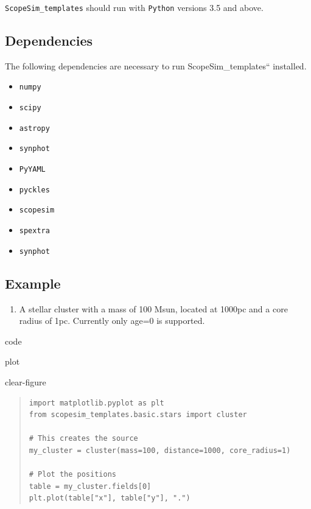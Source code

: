\texttt{ScopeSim\_templates} should run with \texttt{Python} versions 3.5 and above.


\subsection{Dependencies%
  \label{dependencies}%
}

The following dependencies are necessary to run ScopeSim\_templates``
installed.

\begin{itemize}
\item \texttt{numpy}

\item \texttt{scipy}

\item \texttt{astropy}

\item \texttt{synphot}

\item \texttt{PyYAML}

\item \texttt{pyckles}

\item \texttt{scopesim}

\item \texttt{spextra}

\item \texttt{synphot}
\end{itemize}


\subsection{Example%
  \label{example}%
}

\begin{enumerate}
\item A stellar cluster with a mass of 100 Msun, located at 1000pc and a core radius of 1pc. Currently only
age=0 is supported.
\end{enumerate}

\label{scopesim-templates-cluster}
\begin{DUclass}{code}
\begin{DUclass}{plot}
\begin{DUclass}{clear-figure}
\begin{quote}
\begin{alltt}
\begin{lstlisting}[frame=single]
import matplotlib.pyplot as plt
from scopesim_templates.basic.stars import cluster

# This creates the source
my_cluster = cluster(mass=100, distance=1000, core_radius=1)

# Plot the positions
table = my_cluster.fields[0]
plt.plot(table["x"], table["y"], ".")
\end{lstlisting}
\end{alltt}
\end{quote}
\end{DUclass}
\end{DUclass}
\end{DUclass}

